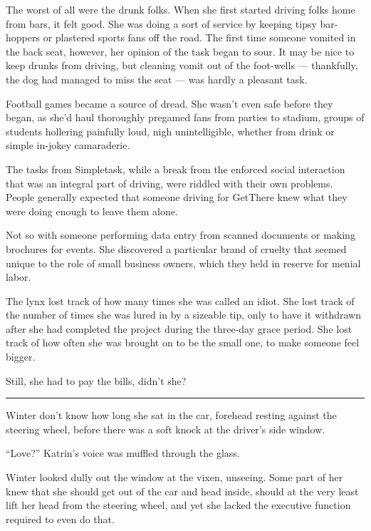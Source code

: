 The worst of all were the drunk folks. When she first started driving folks home from bars, it felt good. She was doing a sort of service by keeping tipsy bar-hoppers or plastered sports fans off the road. The first time someone vomited in the back seat, however, her opinion of the task began to sour. It may be nice to keep drunks from driving, but cleaning vomit out of the foot-wells --- thankfully, the dog had managed to miss the seat --- was hardly a pleasant task.

Football games became a source of dread. She wasn't even safe before they began, as she'd haul thoroughly pregamed fans from parties to stadium, groups of students hollering painfully loud, nigh unintelligible, whether from drink or simple in-jokey camaraderie.

The tasks from Simpletask, while a break from the enforced social interaction that was an integral part of driving, were riddled with their own problems. People generally expected that someone driving for GetThere knew what they were doing enough to leave them alone.

Not so with someone performing data entry from scanned documents or making brochures for events. She discovered a particular brand of cruelty that seemed unique to the role of small business owners, which they held in reserve for menial labor.

The lynx lost track of how many times she was called an idiot. She lost track of the number of times she was lured in by a sizeable tip, only to have it withdrawn after she had completed the project during the three-day grace period. She lost track of how often she was brought on to be the small one, to make someone feel bigger.

Still, she had to pay the bills, didn't she?

\begin{center}\rule{0.5\linewidth}{0.5pt}\end{center}

Winter don't know how long she sat in the car, forehead resting against the steering wheel, before there was a soft knock at the driver's side window.

``Love?'' Katrin's voice was muffled through the glass.

Winter looked dully out the window at the vixen, unseeing. Some part of her knew that she should get out of the car and head inside, should at the very least lift her head from the steering wheel, and yet she lacked the executive function required to even do that.

